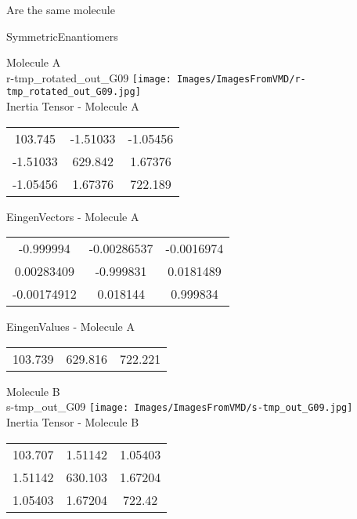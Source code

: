 \begin{center}
\vtab
\vtab
\textcolor{NavyBlue}{\Large Are the same molecule}
\end{center}
\newpage

\vtab[-2cm]
\begin{center}
{\large SymmetricEnantiomers}
\end{center}
\begin{multicols}{2}
\begin{center}
Molecule A \\ 
r-tmp\_rotated\_out\_G09
\texttt{[image: Images/ImagesFromVMD/r-tmp\_rotated\_out\_G09.jpg]}
\\
Inertia Tensor - Molecule A \\
\vtab
\begin{tabular}{|c c c|}
103.745	 & 	-1.51033	 & 	-1.05456	 \\
-1.51033	 & 	629.842	 & 	1.67376	 \\
-1.05456	 & 	1.67376	 & 	722.189
\end{tabular}

\vtab
 EingenVectors - Molecule A     \\
\vtab
\begin{tabular}{|c c c|}
-0.999994	 & 	-0.00286537	 & 	-0.0016974	 \\
0.00283409	 & 	-0.999831	 & 	0.0181489	 \\
-0.00174912	 & 	0.018144	 & 	0.999834
\end{tabular}

\vtab
 EingenValues - Molecule A     \\
\vtab
\begin{tabular}{|c c c|}
103.739	 & 	629.816	 & 	722.221
\end{tabular}
\columnbreak

Molecule B \\ 
s-tmp\_out\_G09
\texttt{[image: Images/ImagesFromVMD/s-tmp\_out\_G09.jpg]}
\\
Inertia Tensor - Molecule B \\
\vtab
\begin{tabular}{|c c c|}
103.707	 & 	1.51142	 & 	1.05403	 \\
1.51142	 & 	630.103	 & 	1.67204	 \\
1.05403	 & 	1.67204	 & 	722.42
\end{tabular}


\end{center}
\end{multicols}
